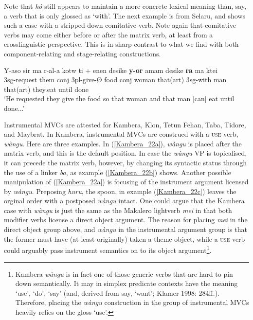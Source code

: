 Note that \textit{hó} still appears to maintain a more concrete lexical meaning than, say, a verb that is only glossed as `with'. The next example is from Selaru, and shows such a case with a stripped-down comitative verb. Note again that comitative verbs may come either before or after the matrix verb, at least from a crosslinguistic perspective. This is in sharp contrast to what we find with both component-relating and stage-relating constructions.

\ea \label{}
\gll Y-aso sir ma r-al-a kotw ti + enen desike \textbf{y-or} amam desike \textbf{ra} ma ktei \\
3\acs{sg}-request them \acs{conj} 3\acs{pl}-give-Ø food \acs{conj} woman that(\acs{art}) 3\acs{sg}-with man that(\acs{art}) they.eat until done \\
\glft `He requested they give the food so that woman and that man [can] eat until done...' \\ 
\z
\xe

Instrumental MVCs are attested for Kambera, Klon, Tetun Fehan, Taba, Tidore, and Maybrat. In Kambera, instrumental MVCs are construed with a \textsc{use} verb, \textit{wàngu}. Here are three examples. In (\ref{Kambera_22a}), \textit{wàngu} is placed after the matrix verb, and this is the default position. In case the \textit{wàngu} VP is topicalised, it can precede the matrix verb, however, by changing its syntactic status through the use of a linker \textit{ba}, as example (\ref{Kambera_22b}) shows. Another possible manipulation of (\ref{Kambera_22a}) is focusing of the instrument argument licensed by \textit{wàngu}. Preposing \textit{huru}, the spoon, in example (\ref{Kambera_22c}) leaves the orginal order with a postposed \textit{wàngu} intact. One could argue that the Kambera case with \textit{wàngu} is just the same as the Makalero lightverb \textit{mei} in that both modifier verbs license a direct object argument. The reason for placing \textit{mei} in the direct object group above, and \textit{wàngu} in the instrumental argument group is that the former must have (at least originally) taken a theme object, while a \textsc{use} verb could arguably pass instrument semantics on to its object argument\footnote{Kambera \textit{wàngu} is in fact one of those generic verbs that are hard to pin down semantically. It may in simplex predicate contexts have the meaning `use', `do', `say' (and, derived from say, `want'; Klamer 1998: 284ff.). Therefore, placing the \textit{wàngu} construction in the group of instrumental MVCs heavily relies on the gloss `use'.}.

